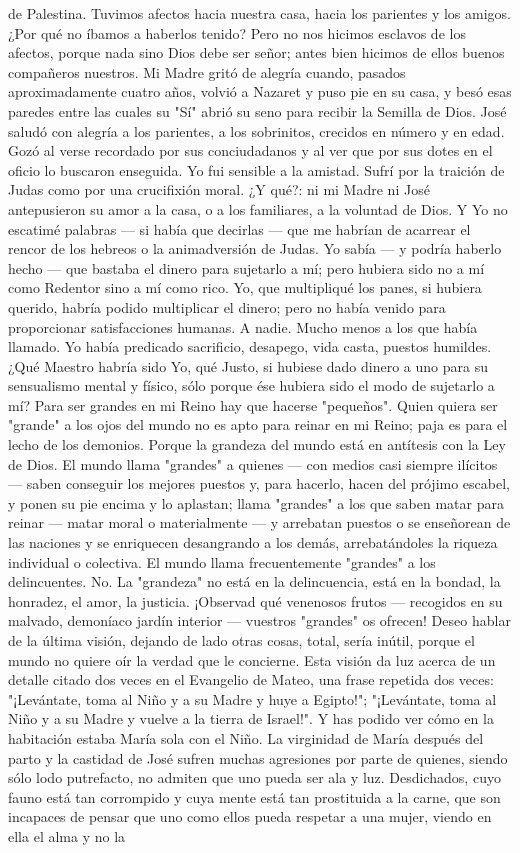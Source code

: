 \documentclass[12pt]{book} %
\begin{document}
de Palestina. Tuvimos afectos hacia nuestra casa, hacia los parientes y los amigos. ¿Por qué no íbamos a haberlos tenido? Pero no nos hicimos esclavos de los afectos, porque nada sino Dios debe ser señor; antes bien hicimos de ellos buenos compañeros nuestros. Mi Madre gritó de alegría cuando, pasados aproximadamente cuatro años, volvió a Nazaret y puso pie en su casa, y besó esas paredes entre las cuales su "Sí" abrió su seno para recibir la Semilla de Dios. José saludó con alegría a los parientes, a los sobrinitos, crecidos en número y en edad. Gozó al verse recordado por sus conciudadanos y al ver que por sus dotes en el oficio lo buscaron enseguida. Yo fui sensible a la amistad. Sufrí por la traición de Judas como por una crucifixión moral. ¿Y qué?: ni mi Madre ni José antepusieron su amor a la casa, o a los familiares, a la voluntad de Dios. Y Yo no escatimé palabras — si había que decirlas — que me habrían de acarrear el rencor de los hebreos o la animadversión de Judas. Yo sabía — y podría haberlo hecho — que bastaba el dinero para sujetarlo a mí; pero hubiera sido no a mí como Redentor sino a mí como rico. Yo, que multipliqué los panes, si hubiera querido, habría podido multiplicar el dinero; pero no había venido para proporcionar satisfacciones humanas. A nadie. Mucho menos a los que había llamado. Yo había predicado sacrificio, desapego, vida casta, puestos humildes. ¿Qué Maestro habría sido Yo, qué Justo, si hubiese dado dinero a uno para su sensualismo mental y físico, sólo porque ése hubiera sido el modo de sujetarlo a mí? Para ser grandes en mi Reino hay que hacerse "pequeños". Quien quiera ser "grande" a los ojos del mundo no es apto para reinar en mi Reino; paja es para el lecho de los demonios. Porque la grandeza del mundo está en antítesis con la Ley de Dios. El mundo llama "grandes" a quienes — con medios casi siempre ilícitos — saben conseguir los mejores puestos y, para hacerlo, hacen del prójimo escabel, y ponen su pie encima y lo aplastan; llama "grandes" a los que saben matar para reinar — matar moral o materialmente — y arrebatan puestos o se enseñorean de las naciones y se enriquecen desangrando a los demás, arrebatándoles la riqueza individual o colectiva. El mundo llama frecuentemente "grandes" a los delincuentes. No. La "grandeza" no está en la delincuencia, está en la bondad, la honradez, el amor, la justicia. ¡Observad qué venenosos frutos — recogidos en su malvado, demoníaco jardín interior — vuestros "grandes" os ofrecen! Deseo hablar de la última visión, dejando de lado otras cosas, total, sería inútil, porque el mundo no quiere oír la verdad que le concierne. Esta visión da luz acerca de un detalle citado dos veces en el Evangelio de Mateo, una frase repetida dos veces: "¡Levántate, toma al Niño y a su Madre y huye a Egipto!"; "¡Levántate, toma al Niño y a su Madre y vuelve a la tierra de Israel!". Y has podido ver cómo en la habitación estaba María sola con el Niño. La virginidad de María después del parto y la castidad de José sufren muchas agresiones por parte de quienes, siendo sólo lodo putrefacto, no admiten que uno pueda ser ala y luz. Desdichados, cuyo fauno está tan corrompido y cuya mente está tan prostituida a la carne, que son incapaces de pensar que uno como ellos pueda respetar a una mujer, viendo en ella el alma y no la 
\end{document}

